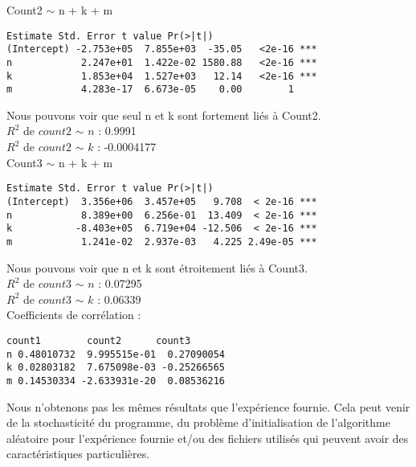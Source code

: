 Count2 $\sim$ n + k + m
\begin{verbatim}
Estimate Std. Error t value Pr(>|t|)    
(Intercept) -2.753e+05  7.855e+03  -35.05   <2e-16 ***
n            2.247e+01  1.422e-02 1580.88   <2e-16 ***
k            1.853e+04  1.527e+03   12.14   <2e-16 ***
m            4.283e-17  6.673e-05    0.00        1    
\end{verbatim}
Nous pouvons voir que seul n et k sont fortement liés à Count2.\\
$R^2$ de $count2$ $\sim$ $n$ : 0.9991\\
$R^2$ de $count2$ $\sim$ $k$ : -0.0004177\\

Count3 $\sim$ n + k + m
\begin{verbatim}
Estimate Std. Error t value Pr(>|t|)    
(Intercept)  3.356e+06  3.457e+05   9.708  < 2e-16 ***
n            8.389e+00  6.256e-01  13.409  < 2e-16 ***
k           -8.403e+05  6.719e+04 -12.506  < 2e-16 ***
m            1.241e-02  2.937e-03   4.225 2.49e-05 ***
\end{verbatim}
Nous pouvons voir que n et k sont étroitement liés à Count3.\\
$R^2$ de $count3$ $\sim$ $n$ : 0.07295\\
$R^2$ de $count3$ $\sim$ $k$ : 0.06339\\

Coefficients de corrélation :
\begin{verbatim}
count1        count2      count3
n 0.48010732  9.995515e-01  0.27090054
k 0.02803182  7.675098e-03 -0.25266565
m 0.14530334 -2.633931e-20  0.08536216
\end{verbatim}


Nous n'obtenons pas les mêmes résultats que l'expérience fournie. Cela peut venir de la stochasticité du programme, du problème d'initialisation de l'algorithme aléatoire pour l'expérience fournie et/ou des fichiers utilisés qui peuvent avoir des caractéristiques particulières.
